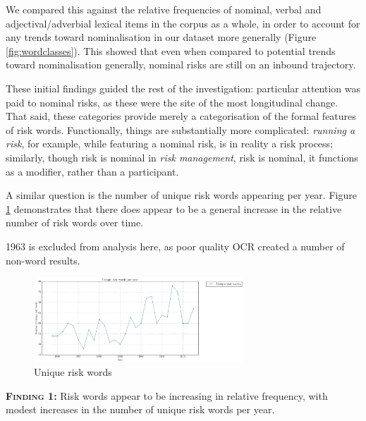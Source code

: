 
	We compared this against the relative frequencies of nominal, verbal and adjectival\slash adverbial lexical items in the corpus as a whole, in order to account for any trends toward nominalisation in our dataset more generally (Figure \ref{fig:wordclasses}). This showed that even when compared to potential trends toward nominalisation generally, nominal risks are still on an inbound trajectory.

	These initial findings guided the rest of the investigation: particular attention was paid to nominal risks, as these were the site of the most longitudinal change. That said, these categories provide merely a categorisation of the formal features of risk words. Functionally, things are substantially more complicated: \emph{running a risk}, for example, while featuring a nominal risk, is in reality a risk process; similarly, though risk is nominal in \emph{risk management}, risk is nominal, it functions as a modifier, rather than a participant.

    A similar question is the number of unique risk words appearing per year. Figure \ref{fig:diffriskwords} demonstrates that there does appear to be a general increase in the relative number of risk words over time. %
    

    1963 is excluded from analysis here, as poor quality OCR created a number of non-word results.
 

            \begin{figure}[htb!]
            \centering
            \includegraphics[width=0.7\textwidth]{../images/unique_risk_words_per_year.png}
            \caption{Unique risk words}
            \label{fig:diffriskwords}
            \end{figure}

  \noindent\colorbox{yellow!20}{%
  \parbox{1\textwidth}{%
  \textsc{\textbf{Finding 1:}} Risk words appear to be increasing in relative frequency, with modest increases in the number of unique risk words per year.}}


